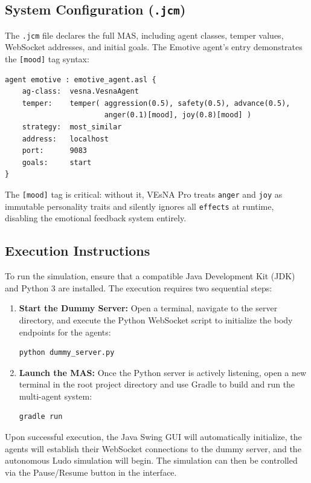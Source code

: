 \documentclass[12pt]{article}
\begin{document}
\subsection{System Configuration (\texttt{.jcm})}
\label{subsec:jcm}
 
\noindent The \texttt{.jcm} file declares the full MAS, including agent classes,
temper values, WebSocket addresses, and initial goals. The Emotive agent's entry
demonstrates the \texttt{[mood]} tag syntax:
 

\begin{verbatim}
agent emotive : emotive_agent.asl {
    ag-class:  vesna.VesnaAgent
    temper:    temper( aggression(0.5), safety(0.5), advance(0.5),
                       anger(0.1)[mood], joy(0.8)[mood] )
    strategy:  most_similar
    address:   localhost
    port:      9083
    goals:     start
}
\end{verbatim}

 
\noindent The \texttt{[mood]} tag is critical: without it, VEsNA Pro treats
\texttt{anger} and \texttt{joy} as immutable personality traits and silently
ignores all \texttt{effects} at runtime, disabling the emotional feedback system
entirely.

\subsection{Execution Instructions}
\label{subsec:execution}
\noindent To run the simulation, ensure that a compatible Java Development Kit (JDK) and Python 3 are installed. The execution requires two sequential steps:

\begin{enumerate}
    \item \textbf{Start the Dummy Server:} Open a terminal, navigate to the server directory, and execute the Python WebSocket script to initialize the body endpoints for the agents:
\begin{verbatim}
python dummy_server.py
\end{verbatim}
    
    \item \textbf{Launch the MAS:} Once the Python server is actively listening, open a new terminal in the root project directory and use Gradle to build and run the multi-agent system:
\begin{verbatim}
gradle run
\end{verbatim}
\end{enumerate}

\noindent Upon successful execution, the Java Swing GUI will automatically initialize, the agents will establish their WebSocket connections to the dummy server, and the autonomous Ludo simulation will begin. The simulation can then be controlled via the Pause/Resume button in the interface.
\end{document}
